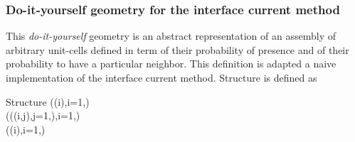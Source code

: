 \subsubsection{Do-it-yourself geometry for the interface current method}\label{sect:descSIJ}

This {\sl do-it-yourself} geometry is an abstract representation of an assembly of arbitrary unit-cells defined in term of their probability of presence and of their probability to have a particular neighbor. This definition is adapted a naive implementation of the interface current method. Structure  is defined as

\begin{DataStructure}{Structure }
 ((i),i=1,) \\
 (((i,j),j=1,),i=1,) \\
  ((i),i=1,)
\end{DataStructure}

